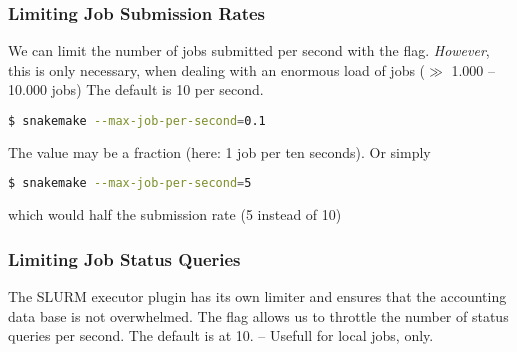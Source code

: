 \begin{frame}[fragile]
	\frametitle{Limiting Job Submission Rates}
	\begin{docs}
		We can limit the number of jobs submitted per second with the  flag.\newline
		\emph{However}, this is only necessary, when dealing with an enormous load of jobs ($\gg$ 1.000 -- 10.000 jobs)\newline\pause
		The default is 10 per second.
	\end{docs}
    \begin{lstlisting}[language=Bash, style=Shell]
$ snakemake --max-job-per-second=0.1
   \end{lstlisting}	
   The value may be a fraction (here: 1 job per ten seconds). Or simply
   \begin{lstlisting}[language=Bash, style=Shell]
$ snakemake --max-job-per-second=5
   \end{lstlisting}
   which would half the submission rate (5 instead of 10)
\end{frame}

\begin{frame}[fragile]
	\frametitle{Limiting Job Status Queries}
	\begin{docs}
		The SLURM executor plugin has its own limiter and ensures that the accounting data base is not overwhelmed.\newline
		The  flag allows us to throttle the number of status queries per second.\newline
		The default is at 10. -- Usefull for local jobs, only.
    \end{docs}
\end{frame}